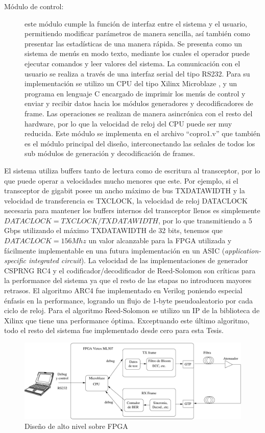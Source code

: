 \begin{description}
 \item[Módulo de control:] este módulo cumple la función de interfaz entre el sistema y el usuario, permitiendo modificar parámetros de manera sencilla, así también como presentar las estadísticas de una manera rápida. Se presenta como un sistema de menús en modo texto, mediante los cuales el operador puede ejecutar comandos y leer valores del sistema. La comunicación con el usuario se realiza a través de una interfaz serial del tipo RS232. Para su implementación se utilizo un CPU del tipo Xilinx Microblaze \cite{Xilinx:DS865}, y un programa en lenguaje C encargado de imprimir los menús de control y enviar y recibir datos hacia los módulos generadores y decodificadores de frame. Las operaciones se realizan de manera asincrónica con el resto del hardware, por lo que la velocidad de reloj del CPU puede ser muy reducida. Este módulo se implementa en el archivo ``copro1.v'' que también es el módulo principal del diseño, interconectando las señales de todos los sub módulos de generación y decodificación de frames.
\end{description}

El sistema utiliza buffers tanto de lectura como de escritura al transceptor, por lo que puede operar a velocidades mucho menores que este. Por ejemplo, si el transceptor de gigabit posee un ancho máximo de bus TXDATAWIDTH y la velocidad de transferencia es TXCLOCK, la velocidad de reloj DATACLOCK necesaria para mantener los buffers internos del transceptor llenos es simplemente $DATACLOCK=TXCLOCK/TXDATAWIDTH$, por lo que transmitiendo a 5 Gbps utilizando el máximo TXDATAWIDTH de 32 bits, tenemos que $DATACLOCK=156Mhz$ un valor alcanzable para la FPGA utilizada y fácilmente implementable en una futura implementación en un ASIC (\textit{application-specific integrated circuit}).
La velocidad de las implementaciones de generador CSPRNG RC4 y el codificador/decodificador de Reed-Solomon son críticas para la performance del sistema ya que el resto de las etapas no introducen mayores retrasos. El algoritmo ARC4 fue implementado en Verilog poniendo especial énfasis en la performance, logrando un flujo de 1-byte pseudoaleatorio por cada ciclo de reloj. Para el algoritmo Reed-Solomon se utilizo un IP de la biblioteca de Xilinx que tiene una performance óptima. Exceptuando este último algoritmo, todo el resto del sistema fue implementado desde cero para esta Tesis.

\begin{figure}[t]
  \centering
    \includegraphics[width=6in]{graphs/fpgadesign.pdf}
\caption {Diseño de alto nivel sobre FPGA}
\label{fig:fpgadesign}
\end{figure}

